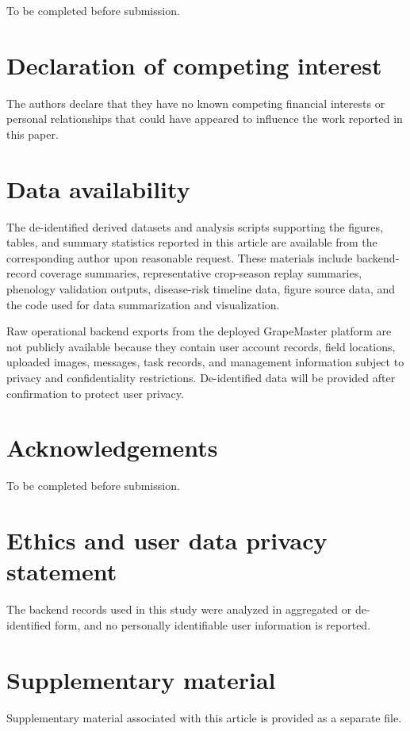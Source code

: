 \documentclass[12pt]{article}
\begin{document}
To be completed before submission.

\section*{Declaration of competing interest}

The authors declare that they have no known competing financial interests or personal relationships that could have appeared to influence the work reported in this paper.

\section*{Data availability}

The de-identified derived datasets and analysis scripts supporting the figures, tables, and summary statistics reported in this article are available from the corresponding author upon reasonable request. These materials include backend-record coverage summaries, representative crop-season replay summaries, phenology validation outputs, disease-risk timeline data, figure source data, and the code used for data summarization and visualization.

Raw operational backend exports from the deployed GrapeMaster platform are not publicly available because they contain user account records, field locations, uploaded images, messages, task records, and management information subject to privacy and confidentiality restrictions. De-identified data will be provided after confirmation to protect user privacy.

\section*{Acknowledgements}

To be completed before submission.

\section*{Ethics and user data privacy statement}

The backend records used in this study were analyzed in aggregated or de-identified form, and no personally identifiable user information is reported.

\section*{Supplementary material}

Supplementary material associated with this article is provided as a separate file.



\end{document}
